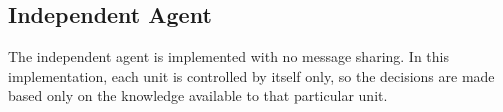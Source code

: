 \subsection{Independent Agent}\label{Independent_Agent}
The independent agent is implemented with no message sharing. In this implementation, each unit is controlled by itself only, so the decisions are made based only on the knowledge available to that particular unit. 






  
%

